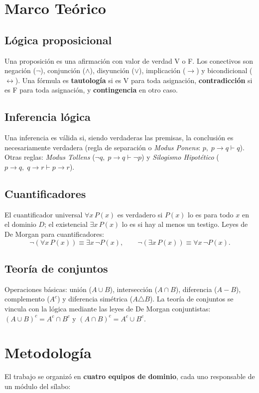 \documentclass[12pt,a4paper]{article}
\begin{document}
\section{Marco Teórico}
\subsection{Lógica proposicional}
Una proposición es una afirmación con valor de verdad V o F. Los conectivos son negación ($\neg$),
conjunción ($\wedge$), disyunción ($\vee$), implicación ($\to$) y bicondicional ($\leftrightarrow$).
Una fórmula es \textbf{tautología} si es V para toda asignación, \textbf{contradicción} si es F para
toda asignación, y \textbf{contingencia} en otro caso.

\subsection{Inferencia lógica}
Una inferencia es válida si, siendo verdaderas las premisas, la conclusión es necesariamente verdadera
(regla de separación o \textit{Modus Ponens}: $p,\; p\to q \vdash q$). Otras reglas: \textit{Modus
Tollens} ($\neg q,\; p\to q \vdash \neg p$) y \textit{Silogismo Hipotético} ($p\to q,\; q\to r \vdash
p\to r$).

\subsection{Cuantificadores}
El cuantificador universal $\forall x\, P(x)$ es verdadero si $P(x)$ lo es para todo $x$ en el
dominio $D$; el existencial $\exists x\, P(x)$ lo es si hay al menos un testigo. Leyes de De Morgan
para cuantificadores:
\[
  \neg(\forall x\, P(x)) \equiv \exists x\, \neg P(x), \qquad
  \neg(\exists x\, P(x)) \equiv \forall x\, \neg P(x).
\]

\subsection{Teoría de conjuntos}
Operaciones básicas: unión ($A\cup B$), intersección ($A\cap B$), diferencia ($A-B$), complemento
($A^c$) y diferencia simétrica ($A\triangle B$). La teoría de conjuntos se vincula con la lógica
mediante las leyes de De Morgan conjuntistas: $(A\cup B)^c = A^c\cap B^c$ y $(A\cap B)^c = A^c\cup B^c$.

\section{Metodología}
El trabajo se organizó en \textbf{cuatro equipos de dominio}, cada uno responsable de un módulo del
sílabo:
\end{document}

